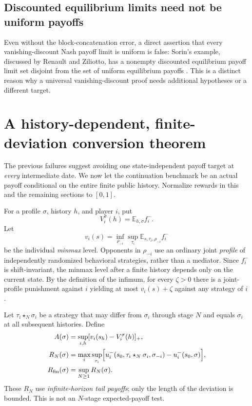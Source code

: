 \documentclass[11pt,a4paper]{article}
\numberwithin{equation}{section}
\theoremstyle{definition}
\theoremstyle{remark}
\newcommand{\E}{\mathbb E}
\newcommand{\sig}{\sigma}
\begin{document}
\subsection{Discounted equilibrium limits need not be uniform payoffs}
Even without the block-concatenation error, a direct assertion that every
vanishing-discount Nash payoff limit is uniform is false: Sorin's example,
discussed by Renault and Ziliotto, has a nonempty discounted equilibrium
payoff limit set disjoint from the set of uniform equilibrium payoffs
\cite{renaultziliotto}. This is a distinct reason why a universal
vanishing-discount proof needs additional hypotheses or a different target.

\section{A history-dependent, finite-deviation conversion theorem}
\label{sec:conversion}
The previous failures suggest avoiding one state-independent payoff target
at \emph{every} intermediate date. We now let the continuation benchmark
be an actual payoff conditional on the entire finite public history.
Normalize rewards in this and the remaining sections to $[0,1]$.

For a profile $\sig$, history $h$, and player $i$, put
\begin{equation}\label{eq:V}
 V_i^\sig(h)=\E_{h,\sig}f_i^-.
\end{equation}
Let
\begin{equation}\label{eq:minmax}
 v_i(s)=\inf_{\rho_{-i}}\sup_{\tau_i}
 \E_{s,\tau_i,\rho_{-i}}f_i^-
\end{equation}
be the individual \emph{minmax} level. Opponents in $\rho_{-i}$ use an
ordinary joint \emph{profile} of independently randomized behavioral
strategies, rather than a mediator. Since $f_i^-$ is shift-invariant, the
minmax level after a finite history depends only on the current state.
By the definition of the infimum, for every $\zeta>0$ there is a
joint-profile punishment against $i$ yielding at most $v_i(s)+\zeta$
against any strategy of $i$.

Let $\tau_i\star_N\sig_i$ be a strategy that may differ from $\sig_i$
through stage $N$ and equals $\sig_i$ at all subsequent histories. Define
\begin{align}
 A(\sig)&=\sup_{i,h}[v_i(s_h)-V_i^\sig(h)]_+,\label{eq:A}\\
 R_N(\sig)&=\max_i\sup_{\tau_i}\Bigl[
  u_i^-(s_0,\tau_i\star_N\sig_i,\sig_{-i})
   -u_i^-(s_0,\sig)\Bigr],\label{eq:RN}\\
 R_{\mathrm{fin}}(\sig)&=\sup_{N\ge1}R_N(\sig).\label{eq:Rfin}
\end{align}
These $R_N$ use \emph{infinite-horizon tail payoffs}; only the length of
the deviation is bounded. This is not an $N$-stage expected-payoff test.
\end{document}
